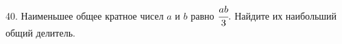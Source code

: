 40. Наименьшее общее кратное чисел $a$ и $b$ равно $\cfrac{ab}{3}.$ Найдите их наибольший общий делитель.\\
